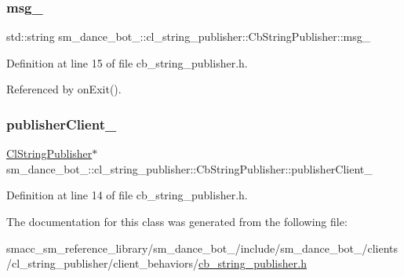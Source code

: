 \subsubsection{\texorpdfstring{msg\+\_\+}{msg\_}}
{\footnotesize\ttfamily std\+::string sm\+\_\+dance\+\_\+bot\+\_\+::cl\+\_\+string\+\_\+publisher\+::\+Cb\+String\+Publisher\+::msg\+\_\+}



Definition at line 15 of file cb\+\_\+string\+\_\+publisher.\+h.



Referenced by on\+Exit().

\mbox{\label{classsm__dance__bot__2_1_1cl__string__publisher_1_1CbStringPublisher_a374db0f8b7ae20321f38c611108cb49a}} 
\subsubsection{\texorpdfstring{publisher\+Client\+\_\+}{publisherClient\_}}
{\footnotesize\ttfamily \hyperlink{classsm__dance__bot__2_1_1cl__string__publisher_1_1ClStringPublisher}{Cl\+String\+Publisher}$\ast$ sm\+\_\+dance\+\_\+bot\+\_\+::cl\+\_\+string\+\_\+publisher\+::\+Cb\+String\+Publisher\+::publisher\+Client\+\_\+}



Definition at line 14 of file cb\+\_\+string\+\_\+publisher.\+h.



The documentation for this class was generated from the following file\+:\begin{DoxyCompactItemize}
\item 
smacc\+\_\+sm\+\_\+reference\+\_\+library/sm\+\_\+dance\+\_\+bot\+\_/include/sm\+\_\+dance\+\_\+bot\+\_/clients/cl\+\_\+string\+\_\+publisher/client\+\_\+behaviors/\hyperlink{sm__dance__bot__2_2include_2sm__dance__bot__2_2clients_2cl__string__publisher_2client__behaviors_2cb__string__publisher_8h}{cb\+\_\+string\+\_\+publisher.\+h}\end{DoxyCompactItemize}
